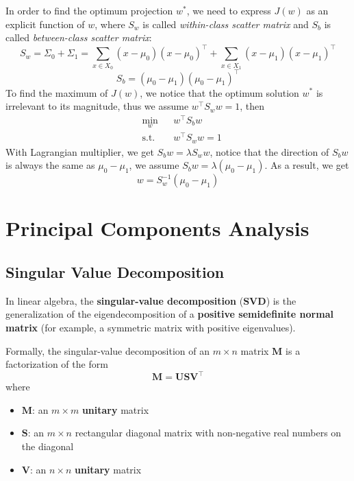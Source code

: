 \documentclass[a3paper, 12pt]{book} %
\begin{document}
In order to find the optimum projection $w^*$, we need to express $J(w)$ as an explicit function of $w$, where $S_w$ is called \emph{within-class scatter matrix} and $S_b$ is called \emph{between-class scatter matrix}:
$$S_w=\Sigma_0 + \Sigma_1=\sum_{x\in X_0}{(x-\mu_0)(x-\mu_0)^\top}+\sum_{x\in X_1}{(x-\mu_1)(x-\mu_1)^\top}$$
$$S_b=(\mu_0-\mu_1)(\mu_0-\mu_1)^\top$$
To find the maximum of $J(w)$, we notice that the optimum solution $w^*$ is irrelevant to its magnitude, thus we assume $w^\top S_ww=1$, then
\begin{equation*}
\begin{aligned}
& \underset{w}{\mathrm{min}}
& & w^\top S_bw \\
& \mathrm{s.t.}
& & w^\top S_ww=1
\end{aligned}
\end{equation*}
With Lagrangian multiplier, we get 
$S_bw=\lambda S_ww$, notice that the direction of $S_bw$ is always the same as $\mu_0-\mu_1$, we assume $S_bw=\lambda{(\mu_0-\mu_1)}$. As a result, we get 
\begin{equation}
w=S_w^{-1}(\mu_0-\mu_1)
\end{equation}

\section{Principal Components Analysis}
\subsection{Singular Value Decomposition}
In linear algebra, the \textbf{singular-value decomposition} (\textbf{SVD}) is the generalization of the eigendecomposition of a \textbf{positive semidefinite normal matrix} (for example, a symmetric matrix with positive eigenvalues).

Formally, the singular-value decomposition of an $m\times n$ matrix $\mathbf{M}$ is a factorization of the form
\begin{equation}
	\mathbf{M} = \mathbf{U}\mathbf{S}\mathbf{V^\top}
\end{equation}
where 
\begin{itemize}
	\item $\mathbf{M}$: an $m\times m$ \textbf{unitary} matrix
	\item $\mathbf{S}$: an $ m\times n$ rectangular diagonal matrix with non-negative real numbers on the diagonal
	\item $\mathbf{V}$: an $n\times n$ \textbf{unitary} matrix
\end{itemize}
\end{document}
